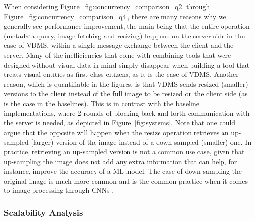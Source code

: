 When considering Figure~\ref{fig:concurrency_comparison_q2}
through Figure~\ref{fig:concurrency_comparison_q4},
there are many reasons why we generally see performance improvement, the main being
that the entire operation (metadata query, image fetching and resizing) happens
on the server side in the case of VDMS, within a single message
exchange between the client and the server.
Many of the inefficiencies that come with combining tools that were designed
without visual data in mind simply disappear when building a tool that treats
visual entities as first class citizens, as it is the case of VDMS.
Another reason, which is quantifiable in the figures, is that
VDMS sends resized (smaller) versions to the client instead of the full image
to be resized on the client side (as is the case in the baselines).
This is in contrast with the baseline implementations,
where 2 rounds of blocking back-and-forth communication with the server is needed,
as depicted in Figure~\ref{fig:systems}.
Note that one could argue that the opposite will happen
when the resize operation retrieves an up-sampled (larger) version of the image
instead of a down-sampled (smaller) one.
In practice, retrieving an up-sampled version is not a common use case,
given that up-sampling the image does not add any extra information that can help,
for instance, improve the accuracy of a ML model.
The case of down-sampling the original image is much more common and is the common
practice when it comes to image processing through CNNs \cite{cnn,resnet}.




\subsubsection{Scalability Analysis}

